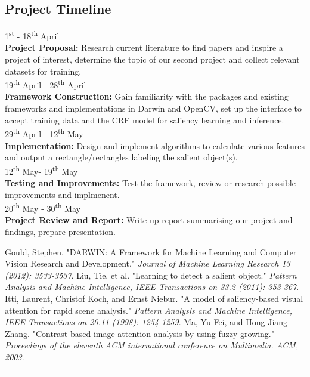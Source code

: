 \documentclass[12pt,a4paper]{article}
\newcommand{\BOLD}{\textbf}
\newcommand{\Hrule}{\textcolor{blue}{\rule{\linewidth}{0.5mm}}}
\newcommand{\SUPER}{\textsuperscript}
\newcommand{\TIMELINE}[3]{#1\\\BOLD{#2} #3}
\newcommand{\TIMELINESPACE}{\\[0.3cm]}
\begin{document}
\begin{multicols}{2}
\section{Project Timeline}
\TIMELINE{1\SUPER{st}  - 18\SUPER{th} April}{Project Proposal:}{Research current literature to find papers and inspire a project of interest, determine the topic of our second project and collect relevant datasets for training.}\TIMELINESPACE
%
\TIMELINE{19\SUPER{th} April - 28\SUPER{th} April}{Framework Construction:}{Gain familiarity with the packages and existing frameworks and implementations in Darwin and OpenCV, set up the interface to accept training data and the CRF model for saliency learning and inference.} \TIMELINESPACE
%
\TIMELINE{29\SUPER{th} April - 12\SUPER{th} May}{Implementation:}{Design and implement algorithms to calculate various features and output a rectangle/rectangles labeling the salient object(s).}\TIMELINESPACE
%
\TIMELINE{12\SUPER{th} May- 19\SUPER{th} May}{Testing and Improvements:}{Test the framework, review or research possible improvements and implmenent.}\TIMELINESPACE
%
\TIMELINE{20\SUPER{th} May - 30\SUPER{th} May}{Project Review and Report:}{Write up report summarising our project and findings, prepare presentation.}
\begin{thebibliography}{0} \footnotesize   \setlength{\itemsep}{-0.5pt}%
     Gould, Stephen. "DARWIN: A Framework for Machine Learning and Computer Vision Research and Development." \textit{Journal of Machine Learning Research 13 (2012): 3533-3537}. 
     Liu, Tie, et al. "Learning to detect a salient object." \textit{Pattern Analysis and Machine Intelligence, IEEE Transactions on 33.2 (2011): 353-367}. 
     Itti, Laurent, Christof Koch, and Ernst Niebur. "A model of saliency-based visual attention for rapid scene analysis."\textit{ Pattern Analysis and Machine Intelligence, IEEE Transactions on 20.11 (1998): 1254-1259}.
     Ma, Yu-Fei, and Hong-Jiang Zhang. "Contrast-based image attention analysis by using fuzzy growing."\textit{ Proceedings of the eleventh ACM international conference on Multimedia. ACM, 2003}. 
\end{thebibliography}
\end{multicols}
\vfill\Hrule
\end{document}
